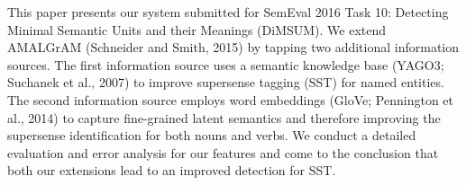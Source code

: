 This paper presents our system submitted for SemEval 2016 Task 10: Detecting Minimal Semantic Units and their Meanings (DiMSUM). We extend AMALGrAM (Schneider and Smith, 2015) by tapping two additional information sources. The first information source uses a semantic knowledge base (YAGO3; Suchanek et al., 2007) to improve supersense tagging (SST) for named entities. The second information source employs word embeddings (GloVe; Pennington et al., 2014) to capture fine-grained latent semantics and therefore improving the supersense identification for both nouns and verbs. We conduct a detailed evaluation and error analysis for our features and come to the conclusion that both our extensions lead to an improved detection for SST.
